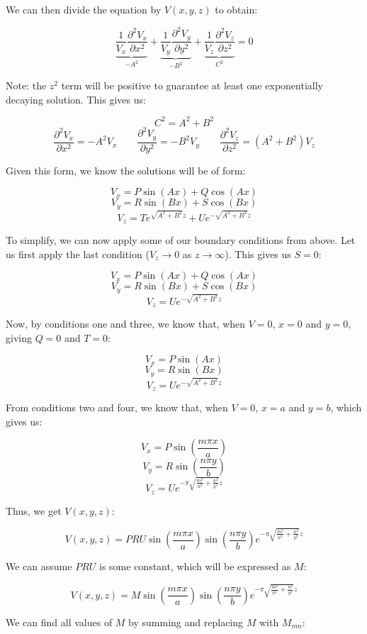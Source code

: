 \begin{enumerate}
        We can then divide the equation by $V(x,y,z)$ to obtain:

        $$\underbrace{\frac{1}{V_x}\frac{\partial^2V_x}{\partial x^2}}_{-A^2}+\underbrace{\frac{1}{V_y}\frac{\partial^2V_y}{\partial y^2}}_{-B^2}+\underbrace{\frac{1}{V_z}\frac{\partial^2V_z}{\partial z^2}}_{C^2}=0$$

        Note: the $z^2$ term will be positive to guarantee at least one exponentially decaying solution. This gives us:

        $$C^2=A^2+B^2$$
        $$\frac{\partial^2V_x}{\partial x^2}=-A^2V_x\quad\quad\frac{\partial^2V_y}{\partial y^2}=-B^2V_y\quad\quad\frac{\partial^2V_z}{\partial z^2}=(A^2+B^2)V_z$$

        Given this form, we know the solutions will be of form:

        $$V_x=P\sin(Ax)+Q\cos(Ax)$$
        $$V_y=R\sin(Bx)+S\cos(Bx)$$
        $$V_z=Te^{\sqrt{A^2+B^2}z}+Ue^{-\sqrt{A^2+B^2}z}$$

        To simplify, we can now apply some of our boundary conditions from above. Let us first apply the last condition ($V_z\to0$ as $z\to\infty$). This gives us $S=0$:

        $$V_x=P\sin(Ax)+Q\cos(Ax)$$
        $$V_y=R\sin(Bx)+S\cos(Bx)$$
        $$V_z=Ue^{-\sqrt{A^2+B^2}z}$$

        Now, by conditions one and three, we know that, when $V=0$, $x=0$ and $y=0$, giving $Q=0$ and $T=0$:

        $$V_x=P\sin(Ax)$$
        $$V_y=R\sin(Bx)$$
        $$V_z=Ue^{-\sqrt{A^2+B^2}z}$$

        From conditions two and four, we know that, when $V=0$, $x=a$ and $y=b$, which gives us:

        $$V_x=P\sin\left( \frac{m\pi x}{a} \right)$$
        $$V_y=R\sin\left( \frac{n\pi y}{b} \right)$$
        $$V_z=Ue^{-\pi\sqrt{\frac{m^2}{a^2}+\frac{n^2}{b^2}}z}$$

        Thus, we get $V(x,y,z)$:

        $$V(x,y,z)=PRU\sin\left( \frac{m\pi x}{a} \right)\sin\left( \frac{n\pi y}{b} \right)e^{-\pi\sqrt{\frac{m^2}{a^2}+\frac{n^2}{b^2}}z}$$

        We can assume $PRU$ is some constant, which will be expressed as $M$:

        $$V(x,y,z)=M\sin\left( \frac{m\pi x}{a} \right)\sin\left( \frac{n\pi y}{b} \right)e^{-\pi\sqrt{\frac{m^2}{a^2}+\frac{n^2}{b^2}}z}$$

        We can find all values of $M$ by summing and replacing $M$ with $M_{mn}$:


\end{enumerate}
